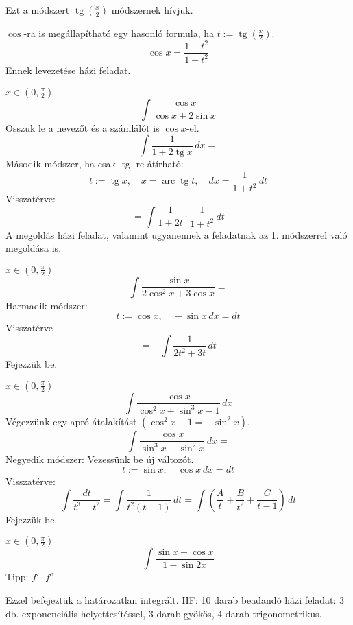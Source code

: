\documentclass[a4paper,11.5pt]{article}
\DeclareMathOperator{\tg}{tg}
\DeclareMathOperator{\arc}{arc}
\begin{document}
	\begin{note}
		Ezt a módszert $\tg\left(\frac{x}{2}\right)$ módszernek hívjuk.
	\end{note}
	\begin{exercise}
		$\cos$-ra is megállapítható egy hasonló formula, ha $t:=\tg\left(\frac{x}{2}\right)$.
		\[\cos x=\frac{1-t^2}{1+t^2} \]
		Ennek levezetése házi feladat.
	\end{exercise}
	\begin{exercise}$x\in\left(0,\frac{\pi}{2}\right)$
		\[ \int\frac{\cos x}{\cos x+2\sin x}\]
		Osszuk le a nevezőt és a számlálót is $\cos x$-el.
		\[ \int\frac{1}{1+2\tg x}\,dx= \]
		Második módszer, ha csak $\tg$-re átírható:
		\[ t:=\tg x,\quad x=\arc\tg t,\quad dx=\frac{1}{1+t^2}\,dt \]
		Visszatérve:
		\[ =\int\frac{1}{1+2t}\cdot\frac{1}{1+t^2}\,dt \]
		A megoldás házi feladat, valamint ugyanennek a feladatnak az 1. módszerrel való megoldása is.
	\end{exercise}
	\begin{exercise}$x\in\left(0,\frac{\pi}{2}\right)$
		\[ \int\frac{\sin x}{2\cos^2x+3\cos x}= \]
		Harmadik módszer:
		\[ t:=\cos x,\quad -\sin x\,dx=dt \]
		Visszatérve
		\[ =-\int\frac{1}{2t^2+3t}\,dt \]
		Fejezzük be.
	\end{exercise}
	\begin{exercise}$x\in\left(0,\frac{\pi}{2}\right)$
		\[ \int\frac{\cos x}{\cos^2x+\sin^3x-1}\,dx \]
		Végezzünk egy apró átalakítást $(\cos^2x-1 = -\sin^2x)$.
		\[ \int\frac{\cos x}{\sin^3x-\sin^2x}\,dx= \]
		Negyedik módszer: Vezessünk be új változót.
		\[ t:=\sin x,\quad \cos x\,dx=dt \]
		Visszatérve:
		\[ \int\frac{dt}{t^3-t^2}=\int\frac{1}{t^2(t-1)}\,dt=\int\left(\frac{A}{t}+\frac{B}{t^2}+\frac{C}{t-1}\right)\,dt \]
		Fejezzük be.
	\end{exercise}
	\begin{exercise}$x\in\left(0,\frac{\pi}{2}\right)$
		\[ \int\frac{\sin x+\cos x}{1-\sin2x} \]
		Tipp: $f'\cdot f^\alpha$
	\end{exercise}
	Ezzel befejeztük a határozatlan integrált. HF: 10 darab beadandó házi feladat: 3 db. exponenciális helyettesítéssel, 3 darab gyökös, 4 darab trigonometrikus.
\end{document}

